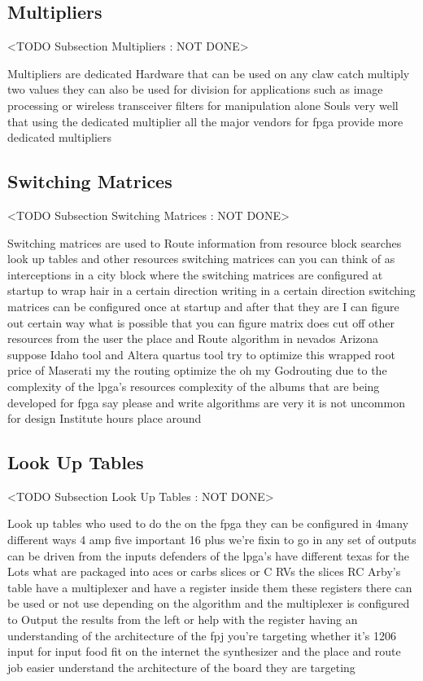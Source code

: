 \subsection{Multipliers}
	<TODO Subsection Multipliers : NOT DONE>

Multipliers are dedicated Hardware that can be used on any claw catch multiply two values they can also be used for division for applications such as image processing or wireless transceiver filters for manipulation alone Souls very well that using the dedicated multiplier all the major vendors for fpga provide more dedicated multipliers

\subsection{Switching Matrices}
	<TODO Subsection Switching Matrices : NOT DONE>

Switching matrices are used to Route information from resource block searches look up tables and other resources switching matrices can you can think of as interceptions in a city block where the switching matrices are configured at startup to wrap hair in a certain direction writing in a certain direction switching matrices can be configured once at startup and after that they are I can figure out certain way what is possible that you can figure matrix does cut off other resources from the user the place and Route algorithm in nevados Arizona suppose Idaho tool and Altera quartus tool try to optimize this wrapped root price of Maserati my the routing optimize the oh my Godrouting due to the complexity of the lpga's resources complexity of the albums that are being developed for fpga say please and write algorithms are very it is not uncommon for design Institute hours place around

\subsection{Look Up Tables}
	<TODO Subsection Look Up Tables : NOT DONE>

Look up tables who used to do the on the fpga they can be configured in 4many different ways 4 amp five important 16 plus we're fixin to go in any set of outputs can be driven from the inputs defenders of the lpga's have different texas for the Lots what are packaged into aces or carbs slices or C RVs the slices RC Arby's table have a multiplexer and have a register inside them these registers there can be used or not use depending on the algorithm and the multiplexer is configured to Output the results from the left or help with the register having an understanding of the architecture of the fpj you're targeting whether it's 1206 input for input food fit on the internet the synthesizer and the place and route job easier understand the architecture of the board they are targeting

